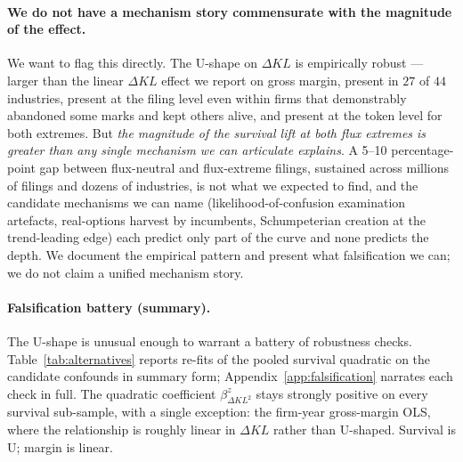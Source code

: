 \documentclass[11pt]{article}
\begin{document}
\paragraph{We do not have a mechanism story commensurate with the
magnitude of the effect.}
We want to flag this directly. The U-shape on $\Delta KL$ is
empirically robust --- larger than the linear $\Delta KL$ effect we
report on gross margin, present in $27$ of $44$ industries, present
at the filing level even within firms that demonstrably abandoned
some marks and kept others alive, and present at the token level for
both extremes. But \emph{the magnitude of the survival lift at both
flux extremes is greater than any single mechanism we can articulate
explains}. A 5--10 percentage-point gap between flux-neutral and
flux-extreme filings, sustained across millions of filings and
dozens of industries, is not what we expected to find, and the
candidate mechanisms we can name (likelihood-of-confusion examination
artefacts, real-options harvest by incumbents, Schumpeterian creation
at the trend-leading edge) each predict only part of the curve and
none predicts the depth. We document the empirical pattern and
present what falsification we can; we do not claim a unified
mechanism story.

\paragraph{Falsification battery (summary).}
The U-shape is unusual enough to warrant a battery of robustness
checks. Table~\ref{tab:alternatives} reports re-fits of the pooled
survival quadratic on the candidate confounds in summary form;
Appendix~\ref{app:falsification} narrates each check in full. The
quadratic coefficient $\beta_{\Delta KL^2}^z$ stays strongly
positive on every survival sub-sample, with a single exception:
the firm-year gross-margin OLS, where the relationship is roughly
linear in $\Delta KL$ rather than U-shaped. Survival is U; margin
is linear.

\begin{table}[h]
\centering
\caption{Summary of the falsification battery for the survival
U-shape. The quadratic coefficient $\beta_{\Delta KL^2}^z$ stays
strongly positive everywhere except in the financial outcome.
Appendix~\ref{app:falsification} narrates each test.}
\label{tab:alternatives}

\end{table}
\end{document}
